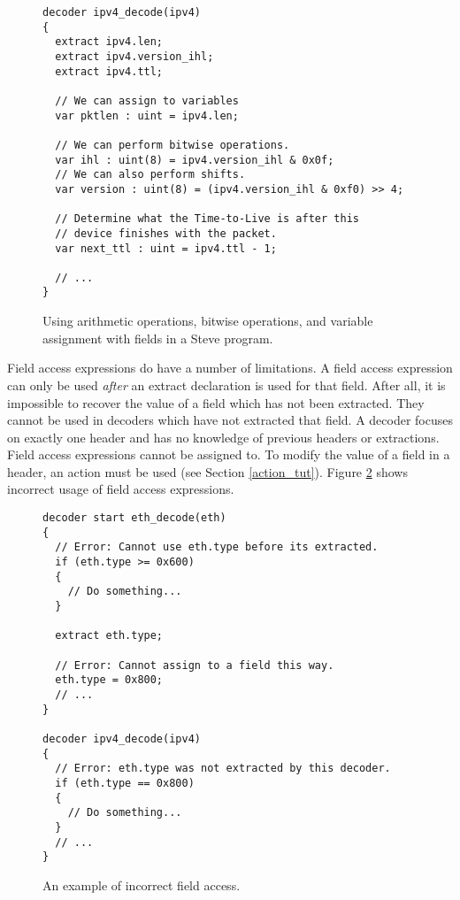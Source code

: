\begin{figure}
\begin{lstlisting}
decoder ipv4_decode(ipv4)
{
  extract ipv4.len;
  extract ipv4.version_ihl;
  extract ipv4.ttl;
  
  // We can assign to variables
  var pktlen : uint = ipv4.len;
  
  // We can perform bitwise operations.
  var ihl : uint(8) = ipv4.version_ihl & 0x0f;
  // We can also perform shifts.
  var version : uint(8) = (ipv4.version_ihl & 0xf0) >> 4;
  
  // Determine what the Time-to-Live is after this
  // device finishes with the packet.
  var next_ttl : uint = ipv4.ttl - 1;
  
  // ...
}
\end{lstlisting}
\caption{Using arithmetic operations, bitwise operations, and variable assignment with fields in a Steve program.}
\label{fg:assign_arith_ex}
\end{figure}

Field access expressions do have a number of limitations. A field access expression can only be used \textit{after} an extract declaration is used for that field. After all, it is impossible to recover the value of a field which has not been extracted. They cannot be used in decoders which have not extracted that field. A decoder focuses on exactly one header and has no knowledge of previous headers or extractions. Field access expressions cannot be assigned to. To modify the value of a field in a header, an action must be used (see Section \ref{action_tut}). Figure \ref{fg:bad_access_ex} shows incorrect usage of field access expressions.

\begin{figure}
\begin{lstlisting}
decoder start eth_decode(eth)
{
  // Error: Cannot use eth.type before its extracted.
  if (eth.type >= 0x600) 
  {
    // Do something...
  }
  
  extract eth.type;
  
  // Error: Cannot assign to a field this way.
  eth.type = 0x800;
  // ...
}

decoder ipv4_decode(ipv4)
{
  // Error: eth.type was not extracted by this decoder.
  if (eth.type == 0x800)
  {
    // Do something...
  }
  // ...
}
\end{lstlisting}
\caption{An example of incorrect field access.}
\label{fg:bad_access_ex}
\end{figure}

